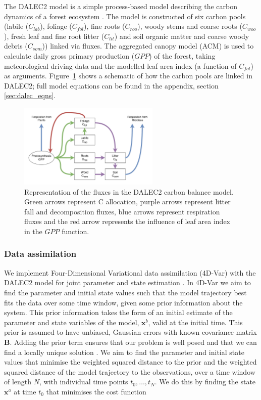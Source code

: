 The DALEC2 model is a simple process-based model describing the carbon dynamics of a forest ecosystem \citep{Bloom2015}. The model is constructed of six carbon pools (labile ($C_{lab}$), foliage ($C_{fol}$), fine roots ($C_{roo}$), woody stems and coarse roots ($C_{woo}$), fresh leaf and fine root litter ($C_{lit}$) and soil organic matter and coarse woody debris ($C_{som}$)) linked via fluxes. The aggregated canopy model (ACM) \citep{williams1997predicting} is used to calculate daily gross primary production ($GPP$) of the forest, taking meteorological driving data and the modelled leaf area index (a function of $C_{fol}$) as arguments. Figure~\ref{fig:DALEC_mod} shows a schematic of how the carbon pools are linked in DALEC2; full model equations can be found in the appendix, section \ref{sec:dalec_eqns}.   

\begin{figure}[ht]
    \centering
    \includegraphics[width=0.6\textwidth]{chapter/chapter7/dalec2diag.pdf}
    \caption{Representation of the fluxes in the DALEC2 carbon balance model. Green arrows represent C allocation, purple arrows represent litter fall and decomposition fluxes, blue arrows represent respiration fluxes and the red arrow represents the influence of leaf area index in the $GPP$ function.} \label{fig:DALEC_mod}
\end{figure}

\subsubsection{Data assimilation} \label{sec:da}

We implement Four-Dimensional Variational data assimilation (4D-Var) with the DALEC2 model for joint parameter and state estimation \citep{navon1998practical}. In 4D-Var we aim to find the parameter and initial state values such that the model trajectory best fits the data over some time window, given some prior information about the system. This prior information takes the form of an initial estimate of the parameter and state variables of the model, $\textbf{x}^{b}$, valid at the initial time. This prior is assumed to have unbiased, Gaussian errors with known covariance matrix $\textbf{B}$. Adding the prior term ensures that our problem is well posed and that we can find a locally unique solution \citep{Tremolet2006}. We aim to find the parameter and initial state values that minimise the weighted squared distance to the prior and the weighted squared distance of the model trajectory to the observations, over a time window of length \(N\), with individual time points $t_{0}, \dots, t_{N}$. We do this by finding the state $\textbf{x}^{a}$ at time $t_{0}$ that minimises the cost function


